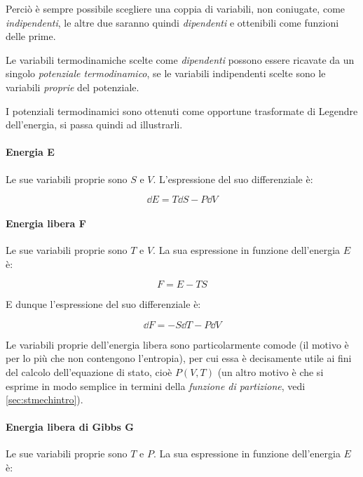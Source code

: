 Perciò è sempre possibile scegliere una coppia di variabili, non coniugate, come \textit{indipendenti}, le altre due saranno quindi \textit{dipendenti} e ottenibili come funzioni delle prime.
\newline

Le variabili termodinamiche scelte come \textit{dipendenti} possono essere ricavate da un singolo \textit{potenziale termodinamico}, se le variabili indipendenti scelte sono le variabili \textit{proprie} del potenziale.

I potenziali termodinamici sono ottenuti come opportune trasformate di Legendre dell'energia, si passa quindi ad illustrarli.

\paragraph{Energia E} Le sue variabili proprie sono $S$ e $V$. L'espressione del suo differenziale è:

\begin{equation*}
\dd E = T \dd S - P \dd V
\end{equation*}

\paragraph{Energia libera F} Le sue variabili proprie sono $T$ e $V$. La sua espressione in funzione dell'energia $E$ è:

\begin{equation*}
F = E - T S
\end{equation*}

E dunque l'espressione del suo differenziale è:

\begin{equation*}
\dd F = - S \dd T - P \dd V
\end{equation*}

\begin{note}
	Le variabili proprie dell'energia libera sono particolarmente comode (il motivo è per lo più che non contengono l'entropia), per cui essa è decisamente utile ai fini del calcolo dell'equazione di stato, cioè $ P(V,T) $ (un altro motivo è che si esprime in modo semplice in termini della \textit{funzione di partizione}, vedi \cref{sec:stmechintro}).
\end{note}

\paragraph{Energia libera di Gibbs G }Le sue variabili proprie sono $T$ e $P$. La sua espressione in funzione dell'energia $E$ è:


